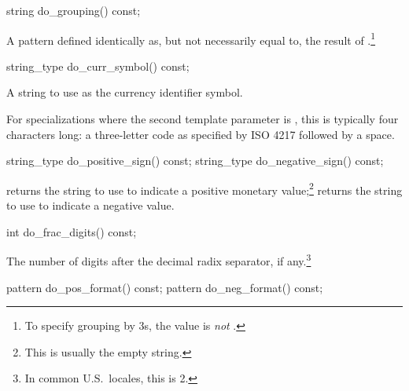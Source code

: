 %
\begin{itemdecl}
string do_grouping() const;
\end{itemdecl}

\begin{itemdescr}
\pnum
\returns
A pattern defined identically as, but not necessarily equal to, the result of
.\footnote{To specify grouping by 3s,
the value is 
\textit{not}
.}
\end{itemdescr}

%
\begin{itemdecl}
string_type do_curr_symbol() const;
\end{itemdecl}

\begin{itemdescr}
\pnum
\returns
A string to use as the currency identifier symbol.
\begin{note}
For specializations where the second template parameter is ,
this is typically four characters long: a three-letter code as specified
by ISO 4217 followed by a space.
\end{note}
\end{itemdescr}

%
%
\begin{itemdecl}
string_type do_positive_sign() const;
string_type do_negative_sign() const;
\end{itemdecl}

\begin{itemdescr}
\pnum
\returns
{}
returns the string to use to indicate a
positive monetary value;\footnote{This is usually the empty string.}
returns the string to use to indicate a negative value.
\end{itemdescr}

%
\begin{itemdecl}
int do_frac_digits() const;
\end{itemdecl}

\begin{itemdescr}
\pnum
\returns
The number of digits after the decimal radix separator, if any.\footnote{In
common U.S.\ locales, this is 2.}
\end{itemdescr}

%
%
\begin{itemdecl}
pattern do_pos_format() const;
pattern do_neg_format() const;
\end{itemdecl}

